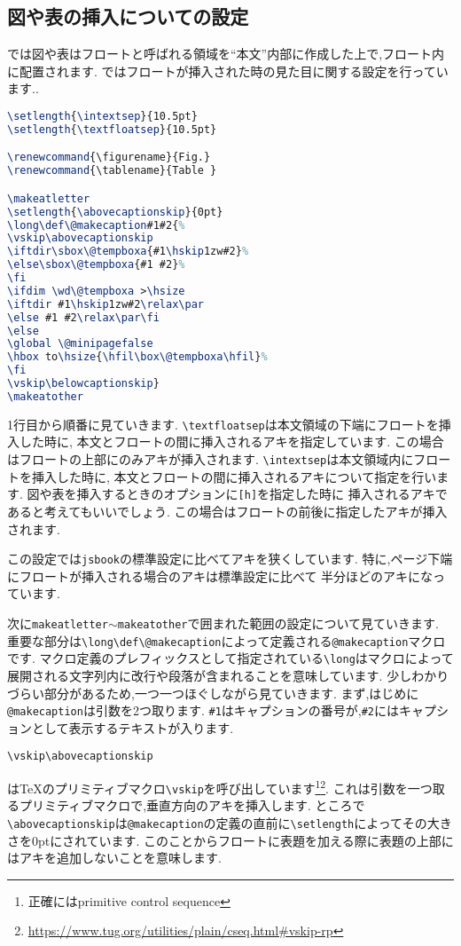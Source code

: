 \subsection{図や表の挿入についての設定}

{\pLaTeX}では図や表はフロートと呼ばれる領域を``本文''内部に作成した上で,フロート内に配置されます.
ではフロートが挿入された時の見た目に関する設定を行っています..
\begin{lstlisting}[caption = フロートついての設定, label = list:float, language = tex]
\setlength{\intextsep}{10.5pt}
\setlength{\textfloatsep}{10.5pt}

\renewcommand{\figurename}{Fig.}
\renewcommand{\tablename}{Table }

\makeatletter
\setlength{\abovecaptionskip}{0pt}
\long\def\@makecaption#1#2{%
\vskip\abovecaptionskip
\iftdir\sbox\@tempboxa{#1\hskip1zw#2}%
\else\sbox\@tempboxa{#1 #2}%
\fi
\ifdim \wd\@tempboxa >\hsize
\iftdir #1\hskip1zw#2\relax\par
\else #1 #2\relax\par\fi
\else
\global \@minipagefalse
\hbox to\hsize{\hfil\box\@tempboxa\hfil}%
\fi
\vskip\belowcaptionskip}
\makeatother
\end{lstlisting}

1行目から順番に見ていきます.
\verb|\textfloatsep|は本文領域の下端にフロートを挿入した時に,
本文とフロートの間に挿入されるアキを指定しています.
この場合はフロートの上部にのみアキが挿入されます.
\verb|\intextsep|は本文領域内にフロートを挿入した時に,
本文とフロートの間に挿入されるアキについて指定を行います.
図や表を挿入するときのオプションに\texttt{[h]}を指定した時に
挿入されるアキであると考えてもいいでしょう.
この場合はフロートの前後に指定したアキが挿入されます.

この設定では\texttt{jsbook}の標準設定に比べてアキを狭くしています.
特に,ページ下端にフロートが挿入される場合のアキは標準設定に比べて
半分ほどのアキになっています.

次に\verb|makeatletter|$\sim$\verb|makeatother|で囲まれた範囲の設定について見ていきます.
重要な部分は\verb|\long\def\@makecaption|によって定義される\verb|@makecaption|マクロです.
マクロ定義のプレフィックスとして指定されている\verb|\long|はマクロによって展開される文字列内に改行や段落が含まれることを意味しています.
少しわかりづらい部分があるため,一つ一つほぐしながら見ていきます.
まず,はじめに\verb|@makecaption|は引数を2つ取ります.
\verb|#1|はキャプションの番号が,\verb|#2|にはキャプションとして表示するテキストが入ります.

\begin{verbatim}
\vskip\abovecaptionskip
\end{verbatim}%
は{\TeX}のプリミティブマクロ\verb|\vskip|を呼び出しています\footnote{正確にはprimitive control sequence}\footnote{\url{https://www.tug.org/utilities/plain/cseq.html#vskip-rp}}.
これは引数を一つ取るプリミティブマクロで,垂直方向のアキを挿入します.
ところで\verb|\abovecaptionskip|は\verb|@makecaption|の定義の直前に\verb|\setlength|によってその大きさを0ptにされています.
このことからフロートに表題を加える際に表題の上部にはアキを追加しないことを意味します.

